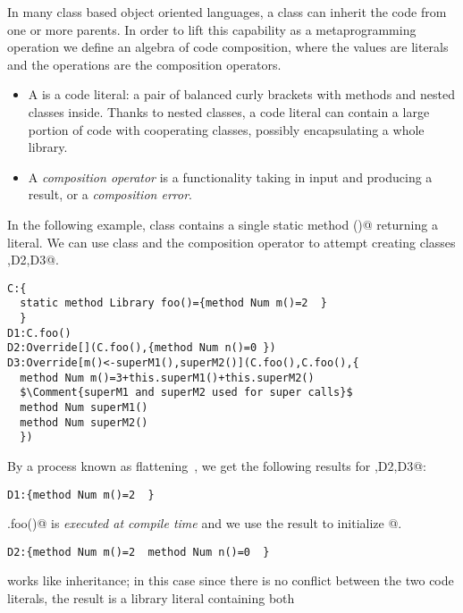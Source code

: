 In many class based object oriented languages, a class can inherit the code
from one or more parents.
In order to lift this capability as a metaprogramming operation 
we define an algebra of code composition, where the values
are \Q@Library@ literals and the operations are the composition operators.

\begin{itemize}
\item A \Q@Library@ is a code literal:
a pair of balanced curly brackets with methods and nested classes inside.
Thanks to nested classes, a code literal can contain a large portion of code
with cooperating classes, possibly encapsulating a whole library.
\item A \emph{composition operator}
is a functionality taking in input \Q@Library@s and producing a \Q@Library@
result, or a \emph{composition error}.
\end{itemize}


In the following example, class \Q@C@ contains a single static 
method \Q@foo()@ returning a \Q@Library@ literal.
We can use class \Q@C@ and the \Q@Override@ composition operator to
attempt creating classes ,D2,D3@.

\begin{lstlisting}
C:{
  static method Library foo()={method Num m()=2  }  
  }
D1:C.foo()
D2:Override[](C.foo(),{method Num n()=0 })
D3:Override[m()<-superM1(),superM2()](C.foo(),C.foo(),{
  method Num m()=3+this.superM1()+this.superM2()
  $\Comment{superM1 and superM2 used for super calls}$
  method Num superM1()
  method Num superM2()
  })
\end{lstlisting}

\noindent
By a process known as flattening~\cite{scharli2003traits}, we get the following results for ,D2,D3@:

\begin{lstlisting}
D1:{method Num m()=2  }  
\end{lstlisting}

\noindent
\Q@C.foo()@ is \emph{executed at compile time}
and we use the result to initialize @.

\begin{lstlisting}
D2:{method Num m()=2  method Num n()=0  }  
\end{lstlisting}

\noindent
\Q@Override@ works like inheritance; in this case since there is no conflict between
the two code literals, the result is a library literal containing both

